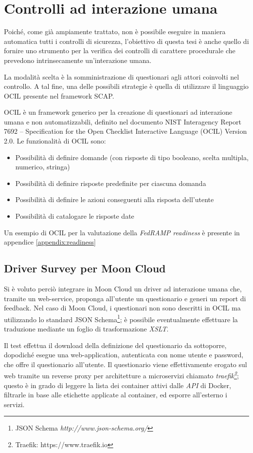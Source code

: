 \documentclass[../main.tex]{subfiles}
\begin{document}
\section{Controlli ad interazione umana}
Poiché, come già ampiamente trattato, non è possibile eseguire in maniera automatica tutti i controlli di sicurezza, l'obiettivo di questa tesi è
anche quello di fornire uno strumento per la verifica dei controlli di carattere procedurale che prevedono intrinsecamente un'interazione umana.

La modalità scelta è la somministrazione di questionari agli attori coinvolti nel controllo. A tal fine, una delle possibili strategie è quella di utilizzare
il linguaggio OCIL presente nel framework SCAP.

OCIL è un framework generico per la creazione di questionari ad interazione umana e non automatizzabili, definito nel documento NIST Interagency Report 7692 – Specification for the Open Checklist Interactive Language (OCIL) Version 2.0.
Le funzionalità di OCIL sono:
\begin{itemize}
    \item Possibilità di definire domande (con risposte di tipo booleano, scelta multipla, numerico, stringa)
    \item Possibilità di definire risposte predefinite per ciascuna domanda
    \item Possibilità di definire le azioni conseguenti alla risposta dell'utente 
    \item Possibilità di catalogare le risposte date
\end{itemize}
Un esempio di OCIL per la valutazione della \textit{FedRAMP readiness} è presente in appendice \ref{appendix:readiness}

\subsection{Driver Survey per Moon Cloud}
\label{subsec:surveymooncloud}
Si è voluto perciò integrare in Moon Cloud un driver ad interazione umana che, tramite un web-service, proponga all'utente un questionario e generi un report di feedback.
Nel caso di Moon Cloud, i questionari non sono descritti in OCIL ma utilizzando lo standard JSON Schema\footnote{JSON Schema \textit{http://www.json-schema.org/}}; è possibile eventualmente effettuare la traduzione mediante un foglio di trasformazione \textit{XSLT}.

Il test effettua il download della definizione del questionario da sottoporre, dopodiché esegue una web-application, autenticata con nome utente e password, che offre il questionario all'utente.
Il questionario viene effettivamente erogato sul web tramite un reverse proxy per architetture a microservizi chiamato \textit{traefik\footnote{Traefik: https://www.traefik.io}}; questo è in grado di leggere la lista dei container attivi dalle \textit{API} di Docker, filtrarle in base alle etichette applicate al container, ed esporre all'esterno i servizi.
\end{document}
